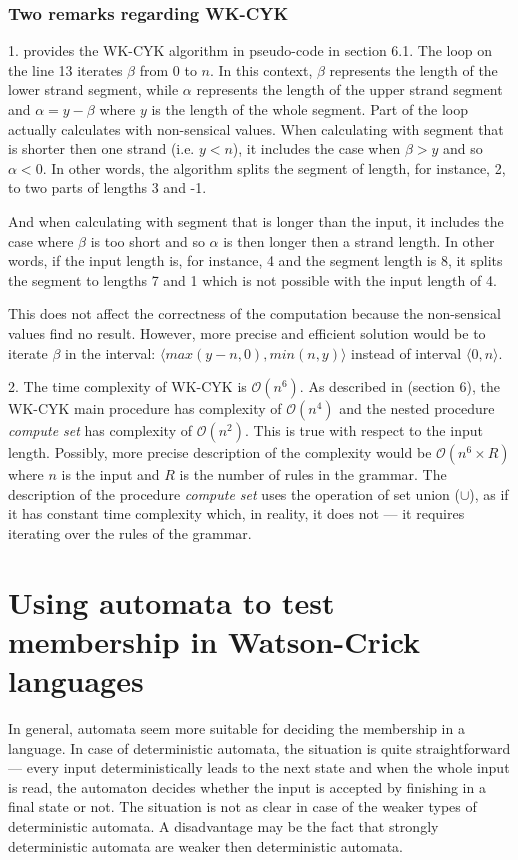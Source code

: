 \subsubsection{Two remarks regarding WK-CYK}
1. \cite{WK_CYK} provides the WK-CYK algorithm in pseudo-code in section 6.1. The loop on the line 13 iterates $\beta$ from 0 to $n$. In this context, $\beta$ represents the length of the lower strand segment, while $\alpha$ represents the length of the upper strand segment and $\alpha = y - \beta$ where $y$ is the length of the whole segment. Part of the loop actually calculates with non-sensical values. When calculating with segment that is shorter then one strand (i.e. $y < n$), it includes the case when $\beta > y$ and so $\alpha < 0$. In other words, the algorithm splits the segment of length, for instance, 2, to two parts of lengths 3 and -1.

And when calculating with segment that is longer than the input, it includes the case where $\beta$ is too short and so $\alpha$ is then longer then a strand length. In other words, if the input length is, for instance, 4 and the segment length is 8, it splits the segment to lengths 7 and 1 which is not possible with the input length of 4.

This does not affect the correctness of the computation because the non-sensical values find no result. However, more precise and efficient solution would be to iterate $\beta$ in the interval: $\langle max(y-n, 0), min(n, y)\rangle$ instead of interval $\langle 0, n\rangle$.

\medskip

2. The time complexity of WK-CYK is $\mathcal{O}(n^6)$. As described in \cite{WK_CYK} (section 6), the WK-CYK main procedure has complexity of $\mathcal{O}(n^4)$ and the nested procedure \textit{compute set} has complexity of $\mathcal{O}(n^2)$. This is true with respect to the input length. Possibly, more precise description of the complexity would be $\mathcal{O}(n^6 \times R)$ where $n$ is the input and $R$ is the number of rules in the grammar. The description of the procedure \textit{compute set} uses the operation of set union ($\cup$), as if it has constant time complexity which, in reality, it does not --- it requires iterating over the rules of the grammar.

\section{Using automata to test membership in Watson-Crick languages}
In general, automata seem more suitable for deciding the membership in a language. In case of deterministic automata, the situation is quite straightforward --- every input deterministically leads to the next state and when the whole input is read, the automaton decides whether the input is accepted by finishing in a final state or not. The situation is not as clear in case of the weaker types of deterministic automata. A disadvantage may be the fact that strongly deterministic automata are weaker then deterministic automata.

